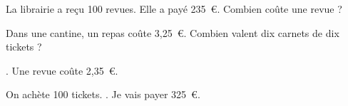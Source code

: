 \begin{myenumerate}
\item La librairie a reçu 100 revues. Elle a payé
235~\textgreek{\euro}. Combien coûte une revue ?
\item Dans une cantine, un repas coûte 3,25~\textgreek{\euro}. Combien
valent dix carnets de dix tickets ?
\end{myenumerate}
\begin{myenumerate}
  \item {}. Une revue coûte 2,35~\textgreek{\euro}.
  \item On achète 100 tickets. . Je vais payer 325~\textgreek{\euro}.
\end{myenumerate}
